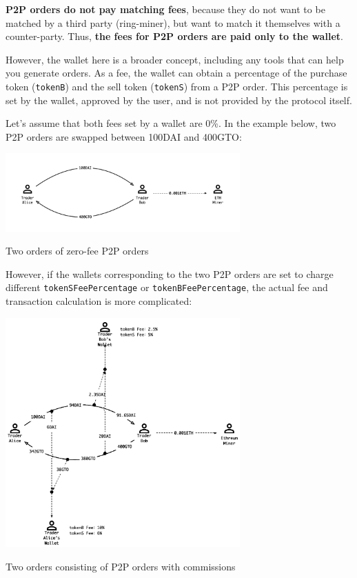 \documentclass[UTF8,nofonts]{article}
\makeatletter
\newenvironment{figurehere}
 {\def\@captype{figure}}
 {}
\makeatother
\begin{document}
\begin{multicols}{2}
\begin{appendices}
\textbf{P2P orders do not pay matching fees}, because they do not want to be matched by a third party (ring-miner), but want to match it themselves with a counter-party. Thus, \textbf{the fees for P2P orders are paid only to the wallet}. 

However, the wallet here is a broader concept, including any tools that can help you generate orders. As a fee, the wallet can obtain a percentage of the purchase token (\verb|tokenB|) and the sell token (\verb|tokenS|) from a P2P order. This percentage is set by the wallet, approved by the user, and is not provided by the protocol itself.

Let’s assume that both fees set by a wallet are 0\%. In the example below, two P2P orders are swapped between 100DAI and 400GTO:

\begin{center}
\begin{figurehere}
\centering
\includegraphics[width=9cm]{3.png}
\caption{Two orders of zero-fee P2P orders}
\end{figurehere}
\end{center}

However, if the wallets corresponding to the two P2P orders are set to charge different \verb|tokenSFeePercentage| or \verb|tokenBFeePercentage|, the actual fee and transaction calculation is more complicated:

\begin{center}
\begin{figurehere}
\centering
\includegraphics[width=9cm]{4.png}
\caption{Two orders consisting of P2P orders with commissions}
\end{figurehere}
\end{center}


\end{appendices}
\end{multicols}
\end{document}
